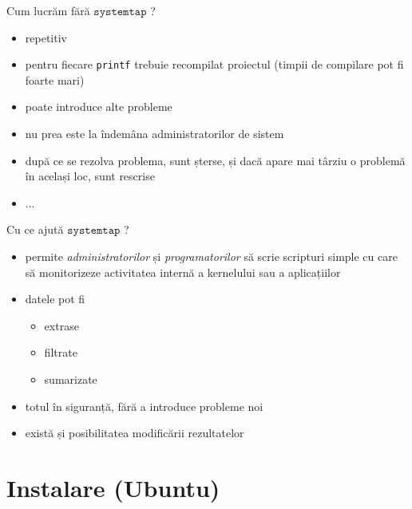 \documentclass{beamer}
\newcommand{\systemtap}{$\texttt{systemtap}$ }
\begin{document}
\begin{frame}{Cum lucrăm fără \systemtap?}
  \begin{itemize}
    \item repetitiv
    \item pentru fiecare \texttt{printf} trebuie recompilat proiectul
      (timpii de compilare pot fi foarte mari)
    \item poate introduce alte probleme
    \item nu prea este la îndemâna administratorilor de sistem
    \item după ce se rezolva problema, sunt șterse, și dacă apare mai
      târziu o problemă în același loc, sunt rescrise
    \item ...
  \end{itemize}
\end{frame}


\begin{frame}{Cu ce ajută \systemtap?}
  \begin{itemize}
    \item permite \textit{administratorilor} și
      \textit{programatorilor} să scrie scripturi simple cu care să
      monitorizeze activitatea internă a kernelului sau a aplicațiilor
    \item datele pot fi
      \begin{itemize}
      \item extrase
      \item filtrate
      \item sumarizate
      \end{itemize}
    \item totul în siguranță, fără a introduce probleme noi
    \item \small există și posibilitatea modificării rezultatelor
  \end{itemize}
\end{frame}









\section{Instalare (Ubuntu)}
\end{document}
